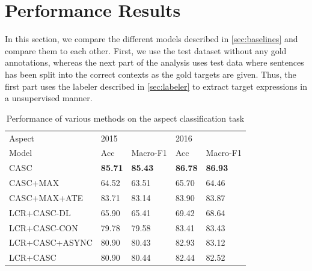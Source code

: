 \documentclass[american, oneside]{ecsgdp}
\begin{document}

\section{Performance Results} \label{sec:performance}
In this section, we compare the different models described in \cref{sec:baselines} and compare them to each other. First, we use the test dataset without any gold annotations, whereas the next part of the analysis uses test data where sentences has been split into the correct contexts as the gold targets are given. Thus, the first part uses the labeler described in \cref{sec:labeler} to extract target expressions in a unsupervised manner.

\begin{table}[htbp]
\centering
\caption{Performance of various methods on the aspect classification task}
\label{tab:aspect-perf}
\begin{tabular}{@{\extracolsep{4pt}}lllll@{}}
\hline
Aspect         & 2015           &                & 2016           &                \\ \cline{2-3} \cline{4-5}
Model          & Acc            & Macro-F1       & Acc            & Macro-F1       \\ \hline
CASC           & \textbf{85.71} & \textbf{85.43} & \textbf{86.78} & \textbf{86.93} \\
CASC+MAX       & 64.52          & 63.51          & 65.70          & 64.46          \\
CASC+MAX+ATE   & 83.71          & 83.14          & 83.90          & 83.87          \\
LCR+CASC-DL    & 65.90          & 65.41          & 69.42          & 68.64          \\
LCR+CASC-CON   & 79.78          & 79.58          & 83.41          & 83.43          \\
LCR+CASC+ASYNC & 80.90	        & 80.43	         &82.93	          & 83.12          \\
LCR+CASC       & 80.90          & 80.44          & 82.44          & 82.52          \\ \hline
\end{tabular}%
\end{table}
\end{document}
